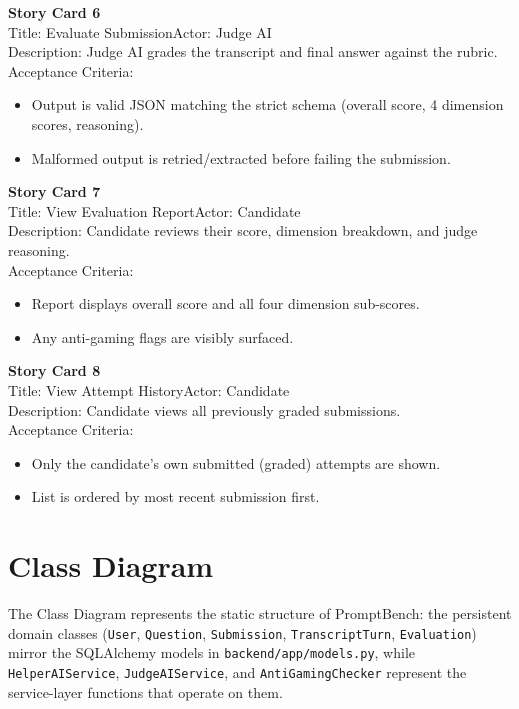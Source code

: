 \documentclass[12pt,a4paper]{report}
\begin{document}
\noindent\textbf{Story Card 6}\\
Title: Evaluate Submission\quad Actor: Judge AI\\
Description: Judge AI grades the transcript and final answer against the rubric.\\
Acceptance Criteria:
\begin{itemize}[nosep]
    \item Output is valid JSON matching the strict schema (overall score, 4 dimension scores,
    reasoning).
    \item Malformed output is retried/extracted before failing the submission.
\end{itemize}
\hrulefill

\noindent\textbf{Story Card 7}\\
Title: View Evaluation Report\quad Actor: Candidate\\
Description: Candidate reviews their score, dimension breakdown, and judge reasoning.\\
Acceptance Criteria:
\begin{itemize}[nosep]
    \item Report displays overall score and all four dimension sub-scores.
    \item Any anti-gaming flags are visibly surfaced.
\end{itemize}
\hrulefill

\noindent\textbf{Story Card 8}\\
Title: View Attempt History\quad Actor: Candidate\\
Description: Candidate views all previously graded submissions.\\
Acceptance Criteria:
\begin{itemize}[nosep]
    \item Only the candidate's own submitted (graded) attempts are shown.
    \item List is ordered by most recent submission first.
\end{itemize}

\section{Class Diagram}

The Class Diagram represents the static structure of PromptBench: the persistent domain classes
(\texttt{User}, \texttt{Question}, \texttt{Submission}, \texttt{TranscriptTurn},
\texttt{Evaluation}) mirror the SQLAlchemy models in \texttt{backend/app/models.py}, while
\texttt{HelperAIService}, \texttt{JudgeAIService}, and \texttt{AntiGamingChecker} represent the
service-layer functions that operate on them.
\end{document}
